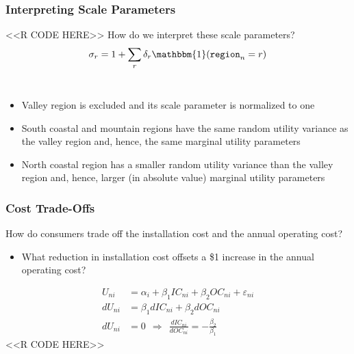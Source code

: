 \documentclass{beamer}
\begin{document}
\begin{frame}[fragile]\frametitle{Interpreting Scale Parameters}
    <<R CODE HERE>>
    \vspace{2ex}
    How do we interpret these scale parameters?
    $$\sigma_r = 1 + \sum_{r} \delta_r \mathbbm{1}(\mathtt{region}_n = r)$$ \\
    \begin{itemize}
    	\item Valley region is excluded and its scale parameter is normalized to one
        \item South coastal and mountain regions have the same random utility variance as the valley region and, hence, the same marginal utility parameters
        \item North coastal region has a smaller random utility variance than the valley region and, hence, larger (in absolute value) marginal utility parameters
    \end{itemize}
\end{frame}

\begin{frame}[fragile]\frametitle{Cost Trade-Offs}
    How do consumers trade off the installation cost and the annual operating cost?
    \begin{itemize}
        \item What reduction in installation cost offsets a \$1 increase in the annual operating cost?
    \end{itemize}
    \begin{align*}
        U_{ni} & = \alpha_i + \beta_1 IC_{ni} + \beta_2 OC_{ni} + \varepsilon_{ni} \\
        dU_{ni} & = \beta_1 dIC_{ni} + \beta_2 dOC_{ni} \\
        dU_{ni} & = 0 ~~ \Rightarrow ~~ \frac{dIC_{ni}}{dOC_{ni}} = -\frac{\beta_2}{\beta_1}
    \end{align*}
    <<R CODE HERE>>
\end{frame}
\end{document}

